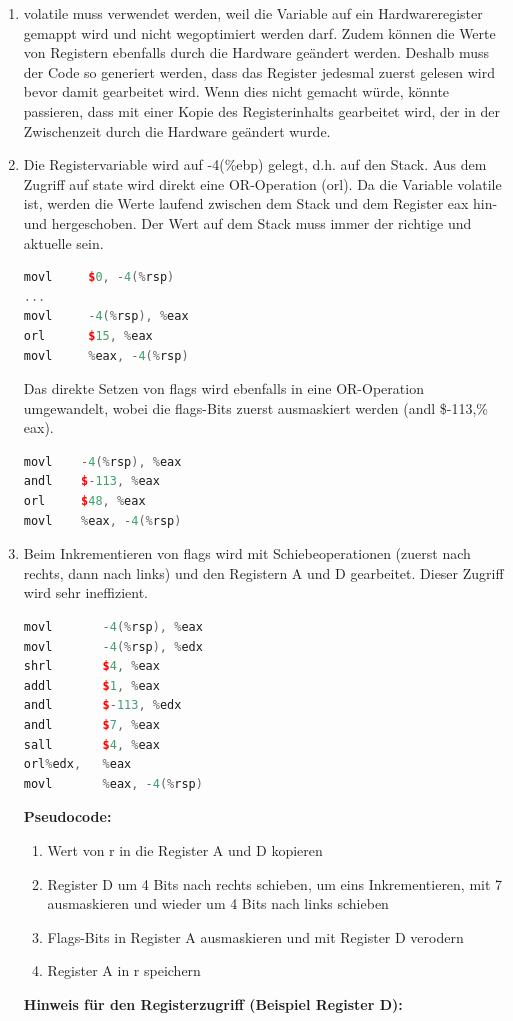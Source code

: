\begin{enumerate}
  \item volatile muss verwendet werden, weil die Variable auf ein Hardwareregister gemappt wird und nicht wegoptimiert werden darf. Zudem können die Werte von Registern ebenfalls durch die Hardware geändert werden. Deshalb muss der Code so generiert werden, dass das Register jedesmal zuerst gelesen wird bevor damit gearbeitet wird. Wenn dies nicht gemacht würde, könnte passieren, dass mit einer Kopie des Registerinhalts gearbeitet wird, der in der Zwischenzeit durch die Hardware geändert wurde.
  

  \item Die Registervariable wird auf -4(\%ebp) gelegt, d.h. auf den Stack. Aus dem Zugriff auf state wird direkt eine OR-Operation (orl). Da die Variable volatile ist, werden die Werte laufend zwischen dem Stack und dem Register eax hin- und hergeschoben. Der Wert auf dem Stack muss immer der richtige und aktuelle sein.
\begin{lstlisting}[language=C++, style=C++]
movl     $0, -4(%rsp)
...
movl     -4(%rsp), %eax
orl      $15, %eax
movl     %eax, -4(%rsp)
\end{lstlisting}
  Das direkte Setzen von flags wird ebenfalls in eine OR-Operation umgewandelt, wobei die flags-Bits zuerst ausmaskiert werden (andl \$-113,\% eax).
\begin{lstlisting}[language=C++, style=C++]
movl    -4(%rsp), %eax
andl    $-113, %eax
orl     $48, %eax
movl    %eax, -4(%rsp)
\end{lstlisting}
  \item Beim Inkrementieren von flags wird mit Schiebeoperationen (zuerst nach rechts, dann nach links) und den Registern A und D gearbeitet. Dieser Zugriff wird sehr ineffizient.
\begin{lstlisting}[language=C++, style=C++]
movl       -4(%rsp), %eax
movl       -4(%rsp), %edx
shrl       $4, %eax
addl       $1, %eax
andl       $-113, %edx
andl       $7, %eax
sall       $4, %eax
orl%edx,   %eax
movl       %eax, -4(%rsp)
\end{lstlisting}
\textbf{Pseudocode:}
\begin{enumerate}
  \item  Wert von r in die Register A und D kopieren
  \item Register D um 4 Bits nach rechts schieben, um eins Inkrementieren, mit 7 ausmaskieren und wieder um 4 Bits nach links schieben
  \item Flags-Bits in Register A ausmaskieren und mit Register D verodern
  \item Register A in r speichern
\end{enumerate}
\textbf{Hinweis für den Registerzugriff (Beispiel Register D):}


\end{enumerate}
